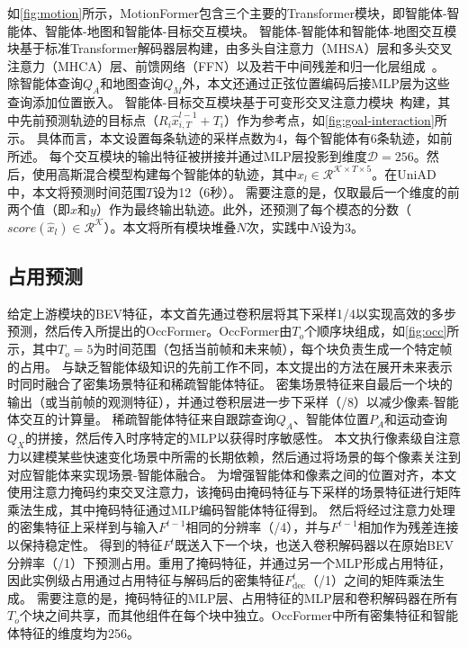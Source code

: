 \documentclass[10pt,twocolumn,letterpaper]{article}
\begin{document}
如\cref{fig:motion}所示，MotionFormer包含三个主要的Transformer模块，即智能体-智能体、智能体-地图和智能体-目标交互模块。
%
智能体-智能体和智能体-地图交互模块基于标准Transformer解码器层构建，由多头自注意力（MHSA）层和多头交叉注意力（MHCA）层、前馈网络（FFN）以及若干中间残差和归一化层组成~\cite{carion2020detr}。
%
除智能体查询$Q_{A}$和地图查询$Q_M$外，本文还通过正弦位置编码后接MLP层为这些查询添加位置嵌入。
%
智能体-目标交互模块基于可变形交叉注意力模块~\cite{zhu2020deformabledetr}构建，其中先前预测轨迹的目标点（$R_i\hat{x}_{i,T}^{l-1} + T_{i}$）作为参考点，如\cref{fig:goal-interaction}所示。
%
具体而言，本文设置每条轨迹的采样点数为4，每个智能体有6条轨迹，如前所述。
%
每个交互模块的输出特征被拼接并通过MLP层投影到维度$\mathcal{D}\!=\!256$。然后，使用高斯混合模型构建每个智能体的轨迹，其中$\hat{x}_{l} \in \mathcal{R}^{\mathcal{K} \times T \times 5}$。在UniAD中，本文将预测时间范围$T$设为12（6秒）。
%
需要注意的是，仅取最后一个维度的前两个值（即$x$和$y$）作为最终输出轨迹。此外，还预测了每个模态的分数（$score(\hat{x}_{l}) \in \mathcal{R}^{\mathcal{K}}$）。本文将所有模块堆叠$N$次，实践中$N$设为3。




\subsection{占用预测}
\label{sec:detail-occ}

给定上游模块的BEV特征，本文首先通过卷积层将其下采样1/4以实现高效的多步预测，然后传入所提出的OccFormer。OccFormer由$T_o$个顺序块组成，如\cref{fig:occ}所示，其中$T_o\!=\!5$为时间范围（包括当前帧和未来帧），每个块负责生成一个特定帧的占用。
%
与缺乏智能体级知识的先前工作不同，本文提出的方法在展开未来表示时同时融合了密集场景特征和稀疏智能体特征。
%
密集场景特征来自最后一个块的输出（或当前帧的观测特征），并通过卷积层进一步下采样（/8）以减少像素-智能体交互的计算量。
%
稀疏智能体特征来自跟踪查询$Q_A$、智能体位置$P_A$和运动查询$Q_X$的拼接，然后传入时序特定的MLP以获得时序敏感性。
%
本文执行像素级自注意力以建模某些快速变化场景中所需的长期依赖，然后通过将场景的每个像素关注到对应智能体来实现场景-智能体融合。
%
为增强智能体和像素之间的位置对齐，本文使用注意力掩码约束交叉注意力，该掩码由掩码特征与下采样的场景特征进行矩阵乘法生成，其中掩码特征通过MLP编码智能体特征得到。
%
然后将经过注意力处理的密集特征上采样到与输入$F^{t-1}$相同的分辨率（/4），并与$F^{t-1}$相加作为残差连接以保持稳定性。
%
得到的特征$F^{t}$既送入下一个块，也送入卷积解码器以在原始BEV分辨率（/1）下预测占用。重用了掩码特征，并通过另一个MLP形成占用特征，因此实例级占用通过占用特征与解码后的密集特征$F^t_{\text{dec}}$（/1）之间的矩阵乘法生成。
%
需要注意的是，掩码特征的MLP层、占用特征的MLP层和卷积解码器在所有$T_o$个块之间共享，而其他组件在每个块中独立。OccFormer中所有密集特征和智能体特征的维度均为256。
\end{document}
